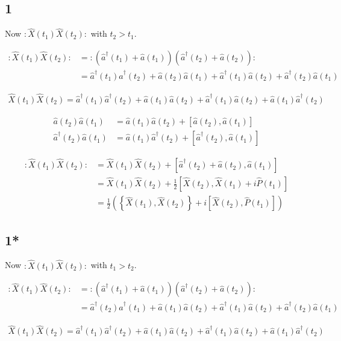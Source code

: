 \documentclass[12pt]{article}
\newcommand{\ahat}{\hat{a}}
\newcommand{\adag}{\ahat^{\dag}}
\begin{document}
\subsection{1}

Now $:\hat{X}(t_1)\hat{X}(t_2):$ with $t_2>t_1$.

\begin{align}
:\hat{X}(t_1)\hat{X}(t_2): &= :(\adag(t_1)+\ahat(t_1))(\adag(t_2)+\ahat(t_2)):\\
&= \adag(t_1)\adag(t_2) + \ahat(t_2)\ahat(t_1) + \adag(t_1)\ahat(t_2) + \adag(t_2)\ahat(t_1)
\end{align}

\begin{align}
\hat{X}(t_1)\hat{X}(t_2) = \adag(t_1)\adag(t_2) + \ahat(t_1)\ahat(t_2) + \adag(t_1)\ahat(t_2) + \ahat(t_1)\adag(t_2)
\end{align}

\begin{align}
\ahat(t_2)\ahat(t_1) &= \ahat(t_1)\ahat(t_2) + \left[\ahat(t_2),\ahat(t_1)\right]\\
\adag(t_2)\ahat(t_1) &= \ahat(t_1)\adag(t_2) + \left[\adag(t_2),\ahat(t_1)\right]
\end{align}

\begin{align}
:\hat{X}(t_1)\hat{X}(t_2): &= \hat{X}(t_1)\hat{X}(t_2) + \left[\adag(t_2) + \ahat(t_2), \ahat(t_1)\right]\\
&= \hat{X}(t_1)\hat{X}(t_2) + \frac{1}{2} \left[\hat{X}(t_2), \hat{X}(t_1) + i \hat{P}(t_1)\right]\\
&= \frac{1}{2}\left(\left\{\hat{X}(t_1),\hat{X}(t_2)\right\} + i \left[\hat{X}(t_2),\hat{P}(t_1)\right]\right)
\end{align}

\pagebreak

\subsection{1*}

Now $:\hat{X}(t_1)\hat{X}(t_2):$ with $t_1>t_2$.

\begin{align}
:\hat{X}(t_1)\hat{X}(t_2): &= :(\adag(t_1)+\ahat(t_1))(\adag(t_2)+\ahat(t_2)):\\
&= \adag(t_2)\adag(t_1) + \ahat(t_1)\ahat(t_2) + \adag(t_1)\ahat(t_2) + \adag(t_2)\ahat(t_1)
\end{align}

\begin{align}
\hat{X}(t_1)\hat{X}(t_2) = \adag(t_1)\adag(t_2) + \ahat(t_1)\ahat(t_2) + \adag(t_1)\ahat(t_2) + \ahat(t_1)\adag(t_2)
\end{align}
\end{document}
